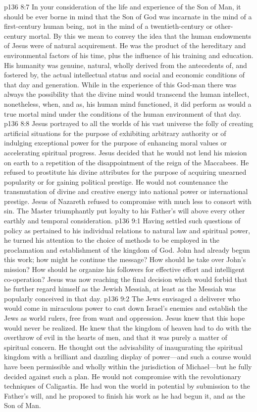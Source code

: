 \pc \vs p136 8:7 In your consideration of the life and experience of the Son of Man, it should be ever borne in mind that the Son of God was incarnate in the mind of a first\hyp{}century human being, not in the mind of a twentieth\hyp{}century or other\hyp{}century mortal. By this we mean to convey the idea that the human endowments of Jesus were of natural acquirement. He was the product of the hereditary and environmental factors of his time, plus the influence of his training and education. His humanity was genuine, natural, wholly derived from the antecedents of, and fostered by, the actual intellectual status and social and economic conditions of that day and generation. While in the experience of this God\hyp{}man there was always the possibility that the divine mind would transcend the human intellect, nonetheless, when, and as, his human mind functioned, it did perform as would a true mortal mind under the conditions of the human environment of that day.\plusone
\pc \vs p136 8:8 Jesus portrayed to all the worlds of his vast universe the folly of creating artificial situations for the purpose of exhibiting arbitrary authority or of indulging exceptional power for the purpose of enhancing moral values or accelerating spiritual progress. Jesus decided that he would not lend his mission on earth to a repetition of the disappointment of the reign of the Maccabees. He refused to prostitute his divine attributes for the purpose of acquiring unearned popularity or for gaining political prestige. He would not countenance the transmutation of divine and creative energy into national power or international prestige. Jesus of Nazareth refused to compromise with  much less to consort with sin. The Master triumphantly put loyalty to his Father’s will above every other earthly and temporal consideration.\plusone
{}
\vs p136 9:1 Having settled such questions of policy as pertained to his individual relations to natural law and spiritual power, he turned his attention to the choice of methods to be employed in the proclamation and establishment of the kingdom of God. John had already begun this work; how might he continue the message? How should he take over John’s mission? How should he organize his followers for effective effort and intelligent co\hyp{}operation? Jesus was now reaching the final decision which would forbid that he further regard himself as the Jewish Messiah, at least as the Messiah was popularly conceived in that day.
\vs p136 9:2 The Jews envisaged a deliverer who would come in miraculous power to cast down Israel’s enemies and establish the Jews as world rulers, free from want and oppression. Jesus knew that this hope would never be realized. He knew that the kingdom of heaven had to do with the overthrow of evil in the hearts of men, and that it was purely a matter of spiritual concern. He thought out the advisability of inaugurating the spiritual kingdom with a brilliant and dazzling display of power---and such a course would have been permissible and wholly within the jurisdiction of Michael---but he fully decided against such a plan. He would not compromise with the revolutionary techniques of Caligastia. He had won the world in potential by submission to the Father’s will, and he proposed to finish his work as he had begun it, and as the Son of Man.
